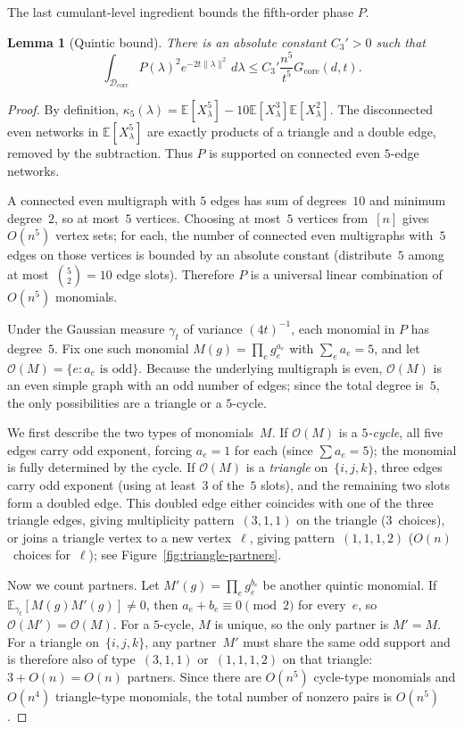 \documentclass[11pt]{article}
\newtheorem{lemma}[theorem]{Lemma}
\theoremstyle{definition}
\newcommand{\E}{\mathbb{E}}
\newcommand{\corereg}{\mathcal{D}_\mathrm{core}}
\newcommand{\core}{G_{\mathrm{core}}}
\begin{document}
The last cumulant-level ingredient bounds the fifth-order phase \(P\).

\begin{lemma}[Quintic bound]\label{lem:quintic}
There is an absolute constant \(C_3'>0\) such that
\[
  \int_{\corereg}P(\lambda)^2e^{-2t\|\lambda\|^2}\,d\lambda
  \le C_3'\frac{n^5}{t^5}\core(d,t).
\]
\end{lemma}

\begin{proof}
By definition, \(\kappa_5(\lambda)=\E[X_\lambda^5]-10\E[X_\lambda^3]\E[X_\lambda^2]\). The disconnected even networks in \(\E[X_\lambda^5]\) are exactly products of a triangle and a double edge, removed by the subtraction. Thus \(P\) is supported on connected even \(5\)-edge networks.

A connected even multigraph with \(5\) edges has sum of degrees~\(10\) and minimum degree~\(2\), so at most~\(5\) vertices. Choosing at most~\(5\) vertices from~\([n]\) gives \(O(n^5)\) vertex sets; for each, the number of connected even multigraphs with~\(5\) edges on those vertices is bounded by an absolute constant (distribute~\(5\) among at most~\(\binom{5}{2}=10\) edge slots). Therefore \(P\) is a universal linear combination of \(O(n^5)\) monomials.

Under the Gaussian measure \(\gamma_t\) of variance \((4t)^{-1}\), each monomial in \(P\) has degree~\(5\). Fix one such monomial \(M(g)=\prod_e g_e^{a_e}\) with \(\sum_e a_e=5\), and let \(\mathcal O(M)=\{e:a_e\text{ is odd}\}\).
Because the underlying multigraph is even, \(\mathcal O(M)\) is an even simple graph with an odd number of edges; since the total degree is~\(5\), the only possibilities are a triangle or a \(5\)-cycle.

We first describe the two types of monomials~\(M\).
If \(\mathcal O(M)\) is a \emph{\(5\)-cycle}, all five edges carry odd exponent, forcing \(a_e=1\) for each (since \(\sum a_e=5\)); the monomial is fully determined by the cycle.
If \(\mathcal O(M)\) is a \emph{triangle} on~\(\{i,j,k\}\), three edges carry odd exponent (using at least~\(3\) of the~\(5\) slots), and the remaining two slots form a doubled edge.
This doubled edge either coincides with one of the three triangle edges, giving multiplicity pattern~\((3,1,1)\) on the triangle (\(3\)~choices), or joins a triangle vertex to a new vertex~\(\ell\), giving pattern~\((1,1,1,2)\) (\(O(n)\)~choices for~\(\ell\)); see Figure~\ref{fig:triangle-partners}.

Now we count partners. Let \(M'(g)=\prod_e g_e^{b_e}\) be another quintic monomial. If \(\E_{\gamma_t}[M(g)M'(g)]\ne 0\), then \(a_e+b_e\equiv 0\pmod 2\) for every~\(e\), so \(\mathcal O(M')=\mathcal O(M)\).
For a \(5\)-cycle, \(M\) is unique, so the only partner is \(M'=M\).
For a triangle on~\(\{i,j,k\}\), any partner~\(M'\) must share the same odd support and is therefore also of type~\((3,1,1)\) or~\((1,1,1,2)\) on that triangle: \(3 + O(n) = O(n)\) partners.
Since there are \(O(n^5)\) cycle-type monomials and \(O(n^4)\) triangle-type monomials, the total number of nonzero pairs is \(O(n^5)\).


\end{proof}
\end{document}
